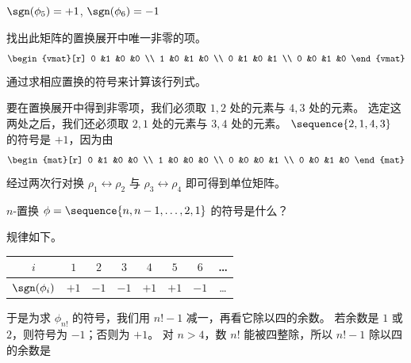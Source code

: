 \begin{exercises}
\begin{answer}
\begin{exparts}
              \( \sgn(\phi_5)=+1 \), \( \sgn(\phi_6)=-1 \)
      \end{exparts}  
     \end{answer}
  \item 
    找出此矩阵的置换展开中唯一非零的项。
    \begin{equation*}
      \begin{vmat}[r]
        0  &1  &0  &0  \\
        1  &0  &1  &0  \\
        0  &1  &0  &1  \\
        0  &0  &1  &0
      \end{vmat}
    \end{equation*}
    通过求相应置换的符号来计算该行列式。
    \begin{answer}
      要在置换展开中得到非零项，我们必须取 \( 1,2 \) 处的元素与
      \( 4,3 \) 处的元素。
      选定这两处之后，我们还必须取 \( 2,1 \) 处的元素与 \( 3,4 \) 处的元素。
      \( \sequence{2,1,4,3} \) 的符号是 \( +1 \)，因为由
      \begin{equation*}
        \begin{mat}[r]
          0  &1  &0  &0  \\
          1  &0  &0  &0  \\
          0  &0  &0  &1  \\
          0  &0  &1  &0            
        \end{mat}
      \end{equation*}
      经过两次行对换 $\rho_1\leftrightarrow\rho_2$ 与
      $\rho_3\leftrightarrow\rho_4$ 即可得到单位矩阵。  
    \end{answer}
  \item  
    \cite{Strang}
    $n$-置换 \( \phi=\sequence{n,n-1,\dots,2,1} \) 的符号是什么？
    \begin{answer}
      规律如下。
      \begin{center}
         \begin{tabular}[b]{c|ccccccc}
           \( i \) &\( 1 \) &\( 2 \) &\( 3 \) &\( 4 \) &\( 5 \)
              &\( 6 \) &\ldots \\
           \hline
           \( \sgn(\phi_i) \) &\( +1 \) &\( -1 \) &\( -1 \) &\( +1 \)
              &\( +1 \) &\( -1 \) &\ldots
         \end{tabular}
      \end{center}  
      于是为求 $\phi_{n!}$ 的符号，我们用 $n!-1$ 减一，再看它除以四的余数。
      若余数是 $1$ 或 $2$，则符号为 $-1$；否则为 $+1$。
      对 $n>4$，数 $n!$ 能被四整除，所以 $n!-1$ 除以四的余数是

\end{answer}
\end{exercises}
